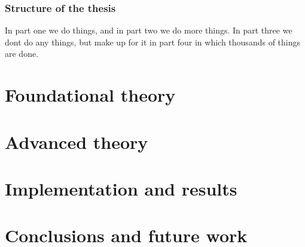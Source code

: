 \documentclass[twoside,english]{uiofysmaster}
\begin{document}
\section{Structure of the thesis}
In part one we do things, and in part two we do more things. In part three we dont do any things, but make up for it in part four in which thousands of things are done.

\part{Foundational theory}




\part{Advanced theory}




\part{Implementation and results}



\part{Conclusions and future work}

\printbibliography
\end{document}
